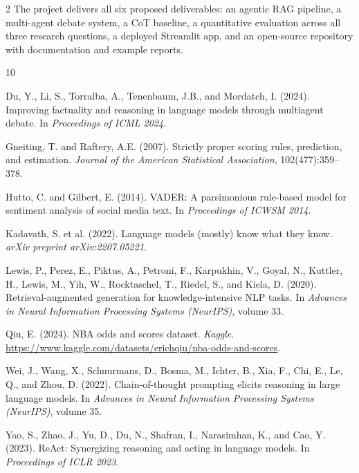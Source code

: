 \documentclass[11pt]{article}
\begin{document}
\begin{multicols}{2}
The project delivers all six proposed deliverables: an agentic RAG pipeline, a multi-agent debate system, a CoT baseline, a quantitative evaluation across all three research questions, a deployed Streamlit app, and an open-source repository with documentation and example reports.


\begin{thebibliography}{10}

Du, Y., Li, S., Torralba, A., Tenenbaum, J.B., and Mordatch, I. (2024).
\newblock Improving factuality and reasoning in language models through multiagent debate.
\newblock In \textit{Proceedings of ICML 2024}.

Gneiting, T. and Raftery, A.E. (2007).
\newblock Strictly proper scoring rules, prediction, and estimation.
\newblock \textit{Journal of the American Statistical Association}, 102(477):359--378.

Hutto, C. and Gilbert, E. (2014).
\newblock VADER: A parsimonious rule-based model for sentiment analysis of social media text.
\newblock In \textit{Proceedings of ICWSM 2014}.

Kadavath, S. et al. (2022).
\newblock Language models (mostly) know what they know.
\newblock \textit{arXiv preprint arXiv:2207.05221}.

Lewis, P., Perez, E., Piktus, A., Petroni, F., Karpukhin, V., Goyal, N., Kuttler, H., Lewis, M., Yih, W., Rocktaschel, T., Riedel, S., and Kiela, D. (2020).
\newblock Retrieval-augmented generation for knowledge-intensive NLP tasks.
\newblock In \textit{Advances in Neural Information Processing Systems (NeurIPS)}, volume 33.

Qiu, E. (2024).
\newblock NBA odds and scores dataset.
\newblock \textit{Kaggle}. \url{https://www.kaggle.com/datasets/erichqiu/nba-odds-and-scores}.

Wei, J., Wang, X., Schuurmans, D., Bosma, M., Ichter, B., Xia, F., Chi, E., Le, Q., and Zhou, D. (2022).
\newblock Chain-of-thought prompting elicits reasoning in large language models.
\newblock In \textit{Advances in Neural Information Processing Systems (NeurIPS)}, volume 35.

Yao, S., Zhao, J., Yu, D., Du, N., Shafran, I., Narasimhan, K., and Cao, Y. (2023).
\newblock ReAct: Synergizing reasoning and acting in language models.
\newblock In \textit{Proceedings of ICLR 2023}.

\end{thebibliography}

\end{multicols}
\end{document}
